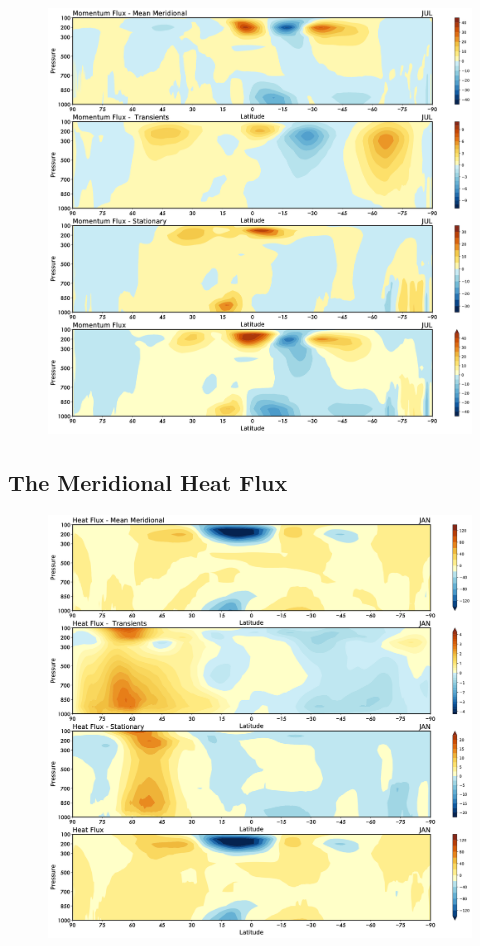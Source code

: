 \begin{figure}
	\centering
	\includegraphics[width = .7 \textwidth]{figs/GD/JULUVFlux.png}
	\caption{}\label{}
\end{figure}

\subsection{The Meridional Heat Flux}\label{the-meridional-heat-flux}

\begin{figure}
	\centering
	\includegraphics[width = .7 \textwidth]{figs/GD/JANTVFlux.png}
	\caption{}\label{}
\end{figure}

